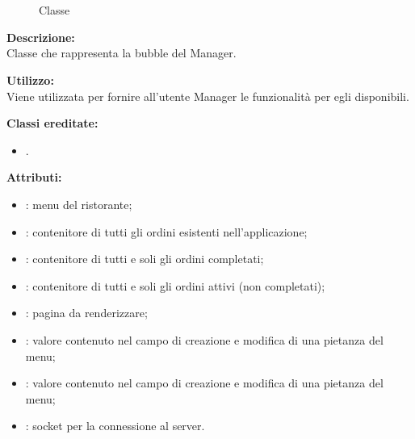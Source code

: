 \paragraph[::BubbleManager]{\class}\mbox{}\\ \label{\class}
\begin{figure}[H]
	\centering
	\caption{Classe \class}
\end{figure}
\textbf{Descrizione:}\\
Classe che rappresenta la bubble del Manager.

\textbf{Utilizzo:}\\
Viene utilizzata per fornire all'utente Manager le funzionalità per egli disponibili.

\textbf{Classi ereditate:}
\begin{itemize}
	\item {}.
\end{itemize}
%

\textbf{Attributi:}
\begin{itemize}
	\item {}: menu del ristorante;
	\item {}: contenitore di tutti gli ordini esistenti nell'applicazione;
	\item {}: contenitore di tutti e soli gli ordini completati;
	\item {}: contenitore di tutti e soli gli ordini attivi (non completati);
	\item {}: pagina da renderizzare;
	\item {}: valore contenuto nel campo  di creazione e modifica di una pietanza del menu;
	\item {}: valore contenuto nel campo  di creazione e modifica di una pietanza del menu;
	\item {}: socket per la connessione al server.
\end{itemize}

